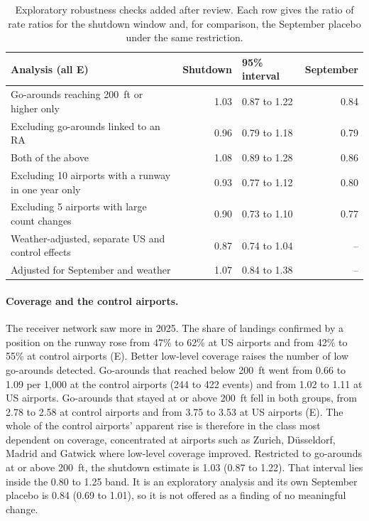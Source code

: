 \documentclass[11pt]{article}
\begin{document}
\begin{table}[ht]
\centering
\caption{Exploratory robustness checks added after review. Each row gives the ratio of rate ratios for the shutdown window and, for comparison, the September placebo under the same restriction. }\label{tab:robust}
\small
\begin{tabular}{lrlr}
\toprule
Analysis (all E) & Shutdown & 95\% interval & September \\
\midrule
Go-arounds reaching 200~ft or higher only & 1.03 & 0.87 to 1.22 & 0.84 \\
Excluding go-arounds linked to an RA & 0.96 & 0.79 to 1.18 & 0.79 \\
Both of the above & 1.08 & 0.89 to 1.28 & 0.86 \\
Excluding 10 airports with a runway in one year only & 0.93 & 0.77 to 1.12 & 0.80 \\
Excluding 5 airports with large count changes & 0.90 & 0.73 to 1.10 & 0.77 \\
Weather-adjusted, separate US and control effects & 0.87 & 0.74 to 1.04 & -- \\
Adjusted for September and weather & 1.07 & 0.84 to 1.38 & -- \\
\bottomrule
\end{tabular}
\end{table}

\paragraph{Coverage and the control airports.} The receiver network saw more in 2025. The share of landings confirmed by a position on the runway rose from 47\% to 62\% at US airports and from 42\% to 55\% at control airports (E). Better low-level coverage raises the number of low go-arounds detected. Go-arounds that reached below 200~ft went from 0.66 to 1.09 per 1,000 at the control airports (244 to 422 events) and from 1.02 to 1.11 at US airports. Go-arounds that stayed at or above 200~ft fell in both groups, from 2.78 to 2.58 at control airports and from 3.75 to 3.53 at US airports (E). The whole of the control airports' apparent rise is therefore in the class most dependent on coverage, concentrated at airports such as Zurich, D\"usseldorf, Madrid and Gatwick where low-level coverage improved. Restricted to go-arounds at or above 200~ft, the shutdown estimate is 1.03 (0.87 to 1.22). That interval lies inside the 0.80 to 1.25 band. It is an exploratory analysis and its own September placebo is 0.84 (0.69 to 1.01), so it is not offered as a finding of no meaningful change.
\end{document}
